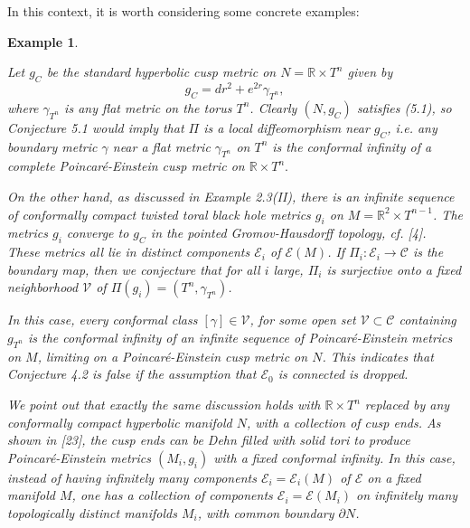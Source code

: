 \documentclass[11pt,amsfonts]{amsart}
\newtheorem{example}[theorem]{Example}
\begin{document}
 In this context, it is worth considering some concrete examples:

\begin{example} \label{ex5.2}
{\rm  Let $g_{C}$ be the standard hyperbolic cusp metric on $N = {\mathbb R} 
\times T^{n}$ given by 
\begin{equation} \label{e5.2}
g_{C} = dr^{2} + e^{2r}\gamma_{T^{n}}, 
\end{equation}
where $\gamma_{T^{n}}$ is any flat metric on the torus $T^{n}$. Clearly 
$(N, g_{C})$ satisfies (5.1), so Conjecture 5.1 would imply that $\Pi$ is a 
local diffeomorphism near $g_{C}$, i.e. any boundary metric $\gamma$ 
near a flat metric $\gamma_{T^{n}}$ on $T^{n}$ is the conformal 
infinity of a complete Poincar\'e-Einstein cusp metric on ${\mathbb R} 
\times T^{n}.$ 

 On the other hand, as discussed in Example 2.3(II), there is an 
infinite sequence of conformally compact twisted toral black hole 
metrics $g_{i}$ on $M = {\mathbb R}^{2}\times T^{n-1}$. The metrics $g_{i}$ 
converge to $g_{C}$ in the pointed Gromov-Hausdorff topology, cf. [4]. These 
metrics all lie in distinct components ${\mathcal E}_{i}$ of ${\mathcal E}(M)$. 
If $\Pi_{i}: {\mathcal E}_{i} \rightarrow  {\mathcal C}$ is the boundary map, 
then we conjecture that for all $i$ large, $\Pi_{i}$ is surjective 
onto a fixed neighborhood ${\mathcal V}$ of $\Pi(g_{i}) = (T^{n}, \gamma_{T^{n}})$. 

 In this case, every conformal class $[\gamma] \in  {\mathcal V}$, for some open 
set ${\mathcal V} \subset {\mathcal C}$ containing $g_{T^{n}}$ is the 
conformal infinity of an infinite sequence of Poincar\'e-Einstein metrics on 
$M$, limiting on a Poincar\'e-Einstein cusp metric on $N$. This indicates that 
Conjecture 4.2 is false if the assumption that ${\mathcal E}_{0}$ is connected 
is dropped. 

 We point out that exactly the same discussion holds with ${\mathbb R} 
\times T^{n}$ replaced by any conformally compact hyperbolic manifold $N$, 
with a collection of cusp ends. As shown in [23], the cusp ends can be Dehn 
filled with solid tori to produce Poincar\'e-Einstein metrics $(M_{i}, 
g_{i})$ with a fixed conformal infinity. In this case, instead of 
having infinitely many components ${\mathcal E}_{i} = {\mathcal E}_{i}(M)$ 
of ${\mathcal E}$ on a fixed manifold $M$, one has a collection of components 
${\mathcal E}_{i} = {\mathcal E} (M_{i})$ on infinitely many topologically 
distinct manifolds $M_{i}$, with common boundary $\partial N$. }
\end{example}
\end{document}
